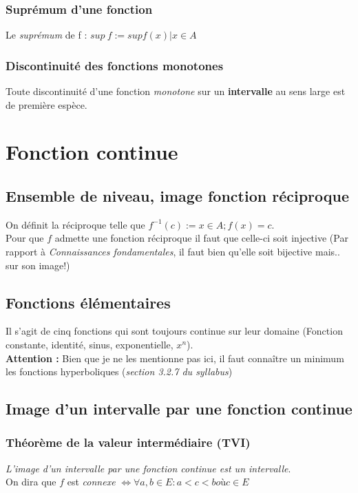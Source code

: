 \documentclass	[11pt, a4paper, openany]{book}
\begin{document}
\subsection{Suprémum d'une fonction}
Le \textit{suprémum} de f : $sup\ f := sup{f(x) | x \in A}$

\subsection{Discontinuité des fonctions monotones}
Toute discontinuité d'une fonction \textit{monotone} sur un \textbf{intervalle} au sens large est de première espèce.

\chapter{Fonction continue}
\section{Ensemble de niveau, image fonction réciproque}
On définit la réciproque telle que $f^{-1} (c) := {x \in A ; f(x) = c}$.\\
Pour que $f$ admette une fonction réciproque il faut que celle-ci soit injective (Par rapport à \textit{Connaissances fondamentales}, il faut bien qu'elle soit bijective mais.. sur son image!)

\section{Fonctions élémentaires}
Il s'agit de cinq fonctions qui sont toujours continue sur leur domaine (Fonction constante, identité, sinus, exponentielle, $x^{n}$).\\
\textbf{Attention :} Bien que je ne les mentionne pas ici, il faut connaître un minimum les fonctions hyperboliques (\textit{section 3.2.7 du syllabus})

\section{Image d'un intervalle par une fonction continue}

\subsection{Théorème de la valeur intermédiaire (TVI)}
\textit{L'image d'un intervalle par une fonction continue est un intervalle}.\\
On dira que $f$ est \textit{connexe} $\Leftrightarrow \forall a, b \in E : a < c < b où c \in E$\\\\
\end{document}

